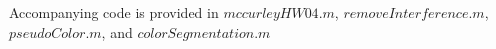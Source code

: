 \documentclass{article}[12 pt]
\begin{document}



 \noindent 
 Accompanying code is provided in $mccurleyHW04.m$, $removeInterference.m$, $pseudoColor.m$, and $colorSegmentation.m$
\end{document}
